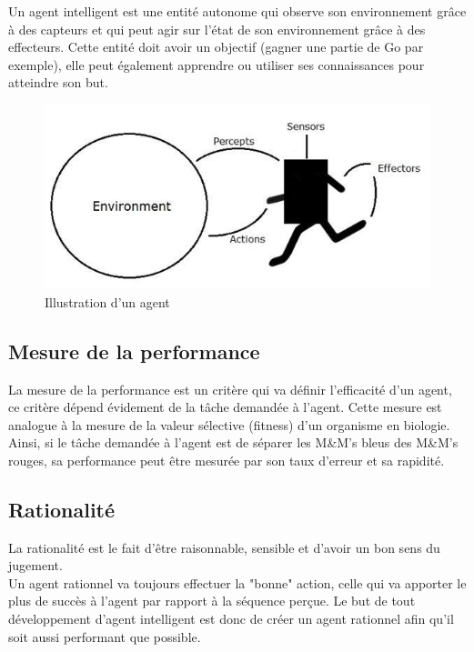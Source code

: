 \documentclass{article}
\begin{document}
Un agent intelligent est une entité autonome qui observe son environnement grâce à des capteurs et qui peut agir sur l'état de son environnement grâce à des effecteurs. Cette entité doit avoir un objectif (gagner une partie de Go par exemple), elle peut également apprendre ou utiliser ses connaissances pour atteindre son but\cite{wikiia}.\\

\begin{figure}[H]
\begin{center}
	\includegraphics[scale=0.5]{agent_environment.jpg}
	\caption{Illustration d'un agent}
\end{center}
\end{figure}

\subsection{Mesure de la performance}

La mesure de la performance est un critère qui va définir l'efficacité d'un agent, ce critère dépend évidement de la tâche demandée à l'agent. Cette mesure est analogue à la mesure de la valeur sélective (fitness) d'un organisme en biologie. Ainsi, si le tâche demandée à l'agent est de séparer les M\&M's bleus des M\&M's rouges, sa performance peut être mesurée par son taux d'erreur et sa rapidité.

\subsection{Rationalité}

La rationalité est le fait d'être raisonnable, sensible et d'avoir un bon sens du jugement.\\
Un agent rationnel va toujours effectuer la "bonne" action, celle qui va apporter le plus de succès à l'agent par rapport à la séquence perçue\cite{tutoptai}. Le but de tout développement d'agent intelligent est donc de créer un agent rationnel afin qu'il soit aussi performant que possible.
\end{document}
